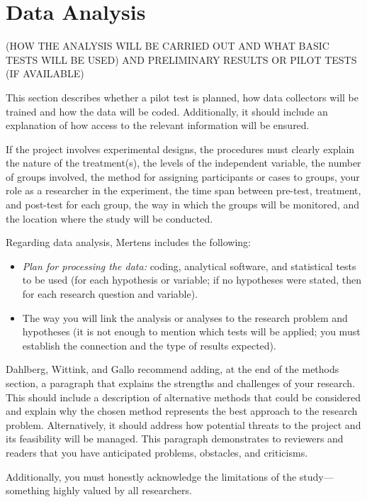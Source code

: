 \section{Data Analysis}

(HOW THE ANALYSIS WILL BE CARRIED OUT AND WHAT BASIC TESTS WILL BE USED) AND PRELIMINARY RESULTS OR PILOT TESTS (IF AVAILABLE)

This section describes whether a pilot test is planned, how data collectors will be trained and how the data will be coded. Additionally, it should include an explanation of how access to the relevant information will be ensured.

If the project involves experimental designs, the procedures must clearly explain the nature of the treatment(s), the levels of the independent variable, the number of groups involved, the method for assigning participants or cases to groups, your role as a researcher in the experiment, the time span between pre-test, treatment, and post-test for each group, the way in which the groups will be monitored, and the location where the study will be conducted.

Regarding data analysis, Mertens\cite{mertens2015} includes the following:

\begin{itemize}
	\item \textit{Plan for processing the data:} coding, analytical software, and statistical tests to be used (for each hypothesis or variable; if no hypotheses were stated, then for each research question and variable).
	\item The way you will link the analysis or analyses to the research problem and hypotheses (it is not enough to mention which tests will be applied; you must establish the connection and the type of results expected).
\end{itemize}

Dahlberg, Wittink, and Gallo\cite{dahlberg2010} recommend adding, at the end of the methods section, a paragraph that explains the strengths and challenges of your research. This should include a description of alternative methods that could be considered and explain why the chosen method represents the best approach to the research problem. Alternatively, it should address how potential threats to the project and its feasibility will be managed. This paragraph demonstrates to reviewers and readers that you have anticipated problems, obstacles, and criticisms.

Additionally, you must honestly acknowledge the limitations of the study—something highly valued by all researchers.

